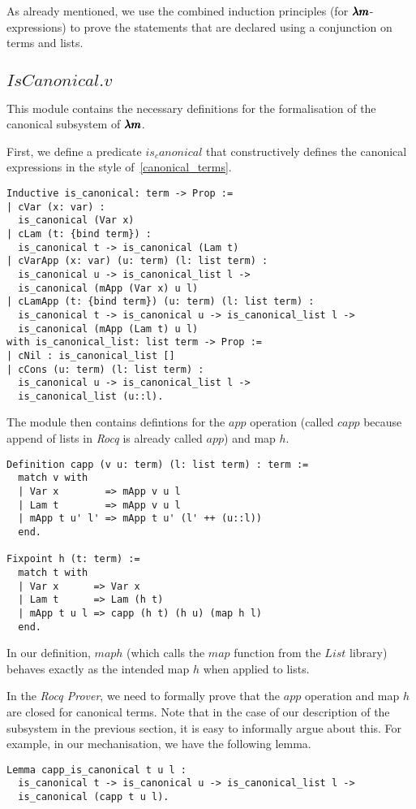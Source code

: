 As already mentioned, we use the combined induction principles (for $\pmb{\lambda m}$-expressions) to prove the statements that are declared using a conjunction on terms and lists.

\subsection{\lst$IsCanonical.v$}

This module contains the necessary definitions for the formalisation of the canonical subsystem of $\pmb{\lambda m}$.

First, we define a predicate \lst$is_canonical$ that constructively defines the canonical expressions in the style of~\cref{canonical_terms}.
\begin{lstlisting}[language=Coq]
Inductive is_canonical: term -> Prop :=
| cVar (x: var) :
  is_canonical (Var x)
| cLam (t: {bind term}) :
  is_canonical t -> is_canonical (Lam t)
| cVarApp (x: var) (u: term) (l: list term) :
  is_canonical u -> is_canonical_list l ->
  is_canonical (mApp (Var x) u l)
| cLamApp (t: {bind term}) (u: term) (l: list term) :
  is_canonical t -> is_canonical u -> is_canonical_list l ->
  is_canonical (mApp (Lam t) u l)
with is_canonical_list: list term -> Prop :=
| cNil : is_canonical_list []
| cCons (u: term) (l: list term) :
  is_canonical u -> is_canonical_list l ->
  is_canonical_list (u::l).
\end{lstlisting}

The module then contains defintions for the $app$ operation (called \lst$capp$ because append of lists in \textit{Rocq} is already called \lst$app$) and map $h$.
\begin{lstlisting}[language=Coq]
Definition capp (v u: term) (l: list term) : term :=
  match v with
  | Var x        => mApp v u l
  | Lam t        => mApp v u l
  | mApp t u' l' => mApp t u' (l' ++ (u::l))
  end.

Fixpoint h (t: term) :=
  match t with
  | Var x      => Var x
  | Lam t      => Lam (h t)
  | mApp t u l => capp (h t) (h u) (map h l)
  end.
\end{lstlisting}
In our definition, \lst$map h$ (which calls the \lst$map$ function from the \lst$List$ library) behaves exactly as the intended map $h$ when applied to lists.

In the \textit{Rocq Prover}, we need to formally prove that the $app$ operation and map $h$ are closed for canonical terms.
Note that in the case of our description of the subsystem in the previous section, it is easy to informally argue about this.
For example, in our mechanisation, we have the following lemma.
\begin{lstlisting}[language=Coq]
Lemma capp_is_canonical t u l :
  is_canonical t -> is_canonical u -> is_canonical_list l ->
  is_canonical (capp t u l).
\end{lstlisting}

